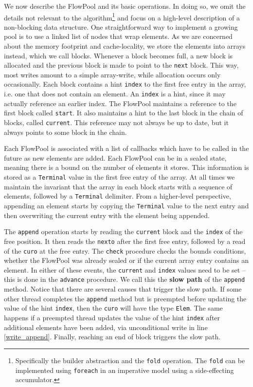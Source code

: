 \documentclass[runningheads,a4paper]{llncs}
\begin{document}
We now describe the FlowPool and its basic operations.
In doing so, we omit the details not relevant to the
algorithm\footnote{Specifically the builder abstraction and the \texttt{fold}
operation. The \texttt{fold} can be implemented using \texttt{foreach}
in an imperative model using a side-effecting accumulator.}
and focus on a high-level description of a non-blocking
data structure.
One straightforward way to implement a growing pool is to use a linked
list of nodes that wrap elements.
As we are concerned about the memory footprint and cache-locality, we
store the elements into arrays instead, which we call blocks.
Whenever a block becomes full, a new block is allocated and the
previous block is made to point to the \verb=next= block.
This way, most writes amount to a simple array-write, while allocation
occurs only occasionally.
Each block contains a hint \verb=index= to the first free entry in
the array, i.e. one that does not contain an element.
An \verb=index= is a hint, since it may actually reference an earlier index.
The FlowPool maintains a reference to the first block called
\verb=start=.
It also maintains a hint to the last block in the chain of blocks,
called \verb=current=.
This reference may not always be up to date, but it always points
to some block in the chain.

Each FlowPool is associated with a list of callbacks which have
to be called in the future as new elements are added.
Each FlowPool can be in a sealed state, meaning there is a bound on
the number of elements it stores.
This information is stored as a \verb=Terminal= value in the first
free entry of the array.
At all times we maintain the invariant that the array in each block
starts with a sequence of elements, followed by a \verb=Terminal=
delimiter. From a higher-level perspective, appending an element
starts by copying the \verb=Terminal= value to the next entry and then
overwriting the current entry with the element being appended.

The \verb=append= operation starts by reading the \verb=current= block
and the \verb=index= of the free position.
It then reads the
\verb=nexto= after the first free entry, followed by a read of the
\verb=curo= at the free entry.
The \verb=check= procedure checks the bounds conditions, whether the
FlowPool was already sealed or if the current array entry contains an
element.
In either of these events, the \verb=current= and \verb=index= values
need to be set -- this is done in the \verb=advance= procedure.
We call this the \textbf{slow path} of the \verb=append= method.
Notice that there are several causes that trigger the slow path.
If some other thread completes the \verb=append= method but is
preempted before updating the value of the hint \verb=index=, then the
\verb=curo= will have the type \verb=Elem=.
The same happens if a preempted thread updates the value of the
hint \verb=index= after additional elements have been added,
via unconditional write in line \ref{write_append}.
Finally, reaching an end of block triggers the slow path.
\end{document}
